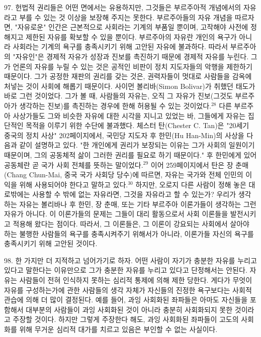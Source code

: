 \documentclass[11pt,a4paper]{article}
\begin{document}
\begin{multicols}{2}
97. 헌법적 권리들은 어떤 면에서는 유용하지만, 그것들은 부르주아적 개념에서의 자유라고 부를 수 있는 것 이상을 보장해 주지는 못한다. 부르주아들의 자유 개념을 따르자면, "자유로운" 인간은 근본적으로  사회라는 기계의 부품일 뿐이며, 고작해야 사전에 정해지고 제한된 자유를 확보할 수 있을 뿐이다.  부르주아의 자유란 개인의 욕구가 아니라 사회라는 기계의 욕구를 충족시키기 위해 고안된 자유에  불과하다. 따라서 부르주아의 "자유인"은 경제적 자유가 성장과 진보를 촉진하기 때문에 경제적 자유를  누린다. 그가 언론의 자유를 누릴 수 있는 것은 공적인 비판이 정치 지도자들의 악행을 제한하기  때문이다. 그가 공정한 재판의 권리를 갖는 것은, 권력자들이 멋대로 사람들을 감옥에 처넣는 것이 사회에 해롭기 때문이다. 사이먼 볼리바(Simon Bolivar)가 취했던 태도가 바로 그런 것이었다. 그가 볼 때,  사람들의 자유는, 오직 그 자유가 진보(그것도 부르주아가 생각하는 진보)를 촉진하는 경우에 한해  허용될 수 있는 것이었다.\hyperlink{28}{$^{28}$} 다른 부르주아 사상가들도 그와 비슷한 자유에 대한 시각을 지니고 있었는 바, 그들에게 자유는 집단적인 목적을 이루기 위한 수단에 불과했다. 체스터 탄(Chester C. Tan)은 "20세기  중국의 정치 사상" 202페이지에서, 국민당 지도자 후 한민(Hu Han-Min)의 사상을 다음과 같이  설명하고 있다. "한 개인에게 권리가 보장되는 이유는 그가 사회의 일원이기 때문이며, 그의 공동체적  삶이 그러한 권리를 필요로 하기 때문이다." 후 한민에게 있어 공동체란 곧 국가 사회 전체를 뜻하는  말이었다.\hyperlink{29}{$^{29}$} 이어 259페이지에서 탄은 장 춘매(Chang Chun-Mai, 중국 국가 사회당 당수)에 따르면,  자유는 국가와 전체 인민의 이익을 위해 사용되어야 한다고 말하고 있다.\hyperlink{30}{$^{30}$} 하지만, 오로지 다른 사람이  정해 놓은 대로밖에는 사용할 수 밖에 없는 자유라면, 그것을 자유라고 할 수 있는가? 우리가 생각하는  자유는 볼리바나 후 한민, 장 춘매, 또는 기타 부르주아 이론가들이 생각하는 그런 자유가 아니다. 이  이론가들의 문제는 그들이 대리 활동으로서 사회 이론들을 발전시키고 적용해 왔다는 점이다. 따라서, 그  이론들은, 그 이론이 강요되는 사회에서 살아야 하는 불행한 사람들의 욕구를 충족시켜주기 위해서가  아니라, 이론가들 자신의 욕구를 충족시키기 위해 고안된 것이다. 


98. 한 가지만 더 지적하고 넘어가기로 하자. 어떤 사람이 자기가 충분한 자유를 누리고 있다고 말한다는  이유만으로 그가 충분한 자유를 누리고 있다고 단정해서는 안된다. 자유는 사람들이 전혀 인식하지  못하는 심리적 통제에 의해 제한 당한다. 게다가 무엇이 자유를 구성하는가에 관한 사람들의 생각 자체가  자신들의 진정한 욕구보다는 사회적 관습에 의해 더 많이 결정된다. 예를 들어, 과잉 사회화된 좌파들은  아마도 자신들을 포함해서 대부분의 사람들이 과잉 사회화된 것이 아니라 충분히 사회화되지 못한  것이라고 주장할 것이다. 하지만 그렇게 주장한다 해도, 과잉 사회화된 좌파들이 고도의 사회화를 위해  무거운 심리적 대가를 치르고 있음은 부인할 수 없는 사실이다.  



\end{multicols}
\end{document}
